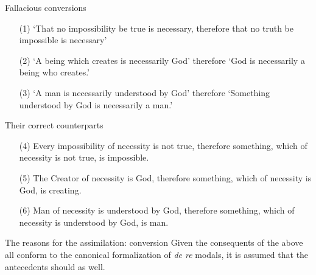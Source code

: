 \documentclass{beamer}
\begin{document}
\begin{frame}{Fallacious conversions}
	\begin{itemize}
		\item[(1)] `That no impossibility be true is necessary, therefore that no truth be impossible is necessary'
		\item[(2)]	`A being which creates is necessarily God' therefore `God is necessarily a being who creates.' 
		\item[(3)]	`A man is necessarily understood by God' therefore `Something understood by God is necessarily a man.' \cite[II. 24, p. 298]{OckhamSL2}
	\end{itemize}
\end{frame}
\begin{frame}{Their correct counterparts}
	\begin{itemize}
		\item[(4)]	Every impossibility of necessity is not true, therefore something, which of necessity is not true, is impossible.
		\item[(5)]	The Creator of necessity is God, therefore something, which of necessity is God, is creating.
		\item[(6)]	Man of necessity is understood by God, therefore something, which of necessity is understood by God, is man. \cite[II. 24, p. 298]{OckhamSL2}
	\end{itemize}
\end{frame}
\begin{frame}{The reasons for the assimilation: conversion}
	Given the consequents of the above all conform to the canonical formalization of \textit{de re} modals, it is assumed that the antecedents should as well.
\end{frame}
\end{document}
